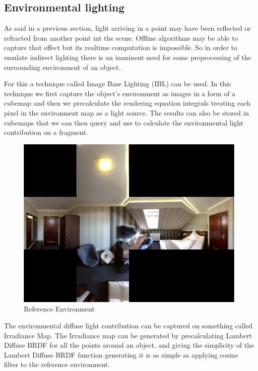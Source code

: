 \subsection{Environmental lighting}
As said in a previous section, light arriving in a point may have been reflected or refracted from another point int the scene.
Offline algorithms may be able to capture that effect but its realtime computation is impossible. So in order to emulate indirect
lighting there is an imminent need for some preprocessing of the surrounding environment of an object.

For this a technique called Image Base Lighting (IBL) can be used. In this technique we first capture the object's environment
as images in a form of a cubemap and then we precalculate the rendering equation integrals treating each pixel in the environment
map as a light source. The results can also be stored in cubemaps that we can then query and use to calculate the environmental
light contribution on a fragment.

\begin{figure}[h]
    \centering
    \includegraphics[scale=0.18,clip=true]{./image/envl_ref.png}
    \caption{Reference Environment}
\label{fig:envlref}
\end{figure}

The environmental diffuse light contribution can be captured on something called Irradiance Map. The Irradiance map can be generated
by precalculating Lambert Diffuse BRDF for all the points around an object, and giving the simplicity of the Lambert Diffuse BRDF
function generating it is as simple as applying cosine filter to the reference environment.

